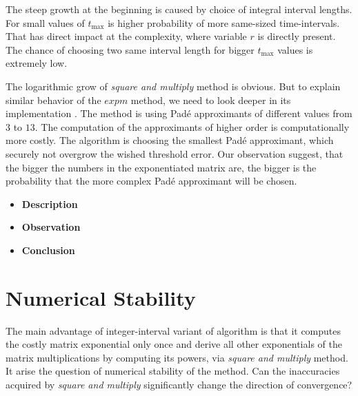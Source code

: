 \documentclass[thesis=M,english]{FITthesis}[2012/10/20]
\begin{document}
\begin{itemize}
The steep growth at the beginning is caused by choice of integral interval lengths. For small values of $t_{\max}$ is higher probability of more same-sized time-intervals. That has direct impact at the complexity, where variable $r$ is directly present. The chance of choosing two same interval length for bigger $t_{\max}$ values is extremely low.

The logarithmic grow of \textit{square and multiply} method is obvious. But to explain similar behavior of the $expm$ method, we need to look deeper in its implementation \cite{Sc01}. %
The method is using Pad\'{e} approximants of different values from $3$ to $13$. The computation of the approximants of higher order is computationally more costly. The algorithm is choosing the smallest  Pad\'{e} approximant, which securely not overgrow the wished threshold error. Our observation suggest, that the bigger the numbers in the exponentiated matrix are, the bigger is the probability that the more complex Pad\'{e} approximant will be chosen.   %

\end{itemize}

\begin{itemize} %
\item \textbf{ Description }
\item \textbf{ Observation }
\item \textbf{ Conclusion }
\end{itemize}


\section{Numerical Stability}\label{sec:ns} 

The main advantage of integer-interval variant of algorithm is that it computes the costly matrix exponential only once and derive all other exponentials of the matrix multiplications by computing its powers, via \textit{square and multiply} method. It arise the question of numerical stability of the method. Can the inaccuracies acquired by \textit{square and multiply} significantly change the direction of convergence?   
\end{document}
